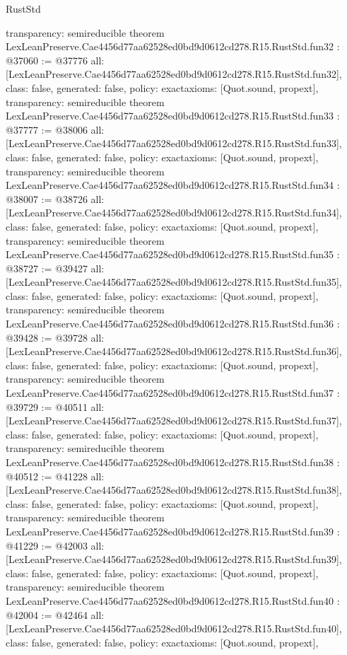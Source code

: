 \begin{lexlean}{RustStd}
\begin{coremodule}
{  transparency: semireducible
}
theorem LexLeanPreserve.Cae4456d77aa62528ed0bd9d0612cd278.R15.RustStd.fun32 : @37060 := @37776 {
  all: [LexLeanPreserve.Cae4456d77aa62528ed0bd9d0612cd278.R15.RustStd.fun32],
  class: false,
  generated: false,
  policy: exact{axioms: [Quot.sound, propext]},
  transparency: semireducible
}
theorem LexLeanPreserve.Cae4456d77aa62528ed0bd9d0612cd278.R15.RustStd.fun33 : @37777 := @38006 {
  all: [LexLeanPreserve.Cae4456d77aa62528ed0bd9d0612cd278.R15.RustStd.fun33],
  class: false,
  generated: false,
  policy: exact{axioms: [Quot.sound, propext]},
  transparency: semireducible
}
theorem LexLeanPreserve.Cae4456d77aa62528ed0bd9d0612cd278.R15.RustStd.fun34 : @38007 := @38726 {
  all: [LexLeanPreserve.Cae4456d77aa62528ed0bd9d0612cd278.R15.RustStd.fun34],
  class: false,
  generated: false,
  policy: exact{axioms: [Quot.sound, propext]},
  transparency: semireducible
}
theorem LexLeanPreserve.Cae4456d77aa62528ed0bd9d0612cd278.R15.RustStd.fun35 : @38727 := @39427 {
  all: [LexLeanPreserve.Cae4456d77aa62528ed0bd9d0612cd278.R15.RustStd.fun35],
  class: false,
  generated: false,
  policy: exact{axioms: [Quot.sound, propext]},
  transparency: semireducible
}
theorem LexLeanPreserve.Cae4456d77aa62528ed0bd9d0612cd278.R15.RustStd.fun36 : @39428 := @39728 {
  all: [LexLeanPreserve.Cae4456d77aa62528ed0bd9d0612cd278.R15.RustStd.fun36],
  class: false,
  generated: false,
  policy: exact{axioms: [Quot.sound, propext]},
  transparency: semireducible
}
theorem LexLeanPreserve.Cae4456d77aa62528ed0bd9d0612cd278.R15.RustStd.fun37 : @39729 := @40511 {
  all: [LexLeanPreserve.Cae4456d77aa62528ed0bd9d0612cd278.R15.RustStd.fun37],
  class: false,
  generated: false,
  policy: exact{axioms: [Quot.sound, propext]},
  transparency: semireducible
}
theorem LexLeanPreserve.Cae4456d77aa62528ed0bd9d0612cd278.R15.RustStd.fun38 : @40512 := @41228 {
  all: [LexLeanPreserve.Cae4456d77aa62528ed0bd9d0612cd278.R15.RustStd.fun38],
  class: false,
  generated: false,
  policy: exact{axioms: [Quot.sound, propext]},
  transparency: semireducible
}
theorem LexLeanPreserve.Cae4456d77aa62528ed0bd9d0612cd278.R15.RustStd.fun39 : @41229 := @42003 {
  all: [LexLeanPreserve.Cae4456d77aa62528ed0bd9d0612cd278.R15.RustStd.fun39],
  class: false,
  generated: false,
  policy: exact{axioms: [Quot.sound, propext]},
  transparency: semireducible
}
theorem LexLeanPreserve.Cae4456d77aa62528ed0bd9d0612cd278.R15.RustStd.fun40 : @42004 := @42464 {
  all: [LexLeanPreserve.Cae4456d77aa62528ed0bd9d0612cd278.R15.RustStd.fun40],
  class: false,
  generated: false,
  policy: exact{axioms: [Quot.sound, propext]},
}
\end{coremodule}
\end{lexlean}
